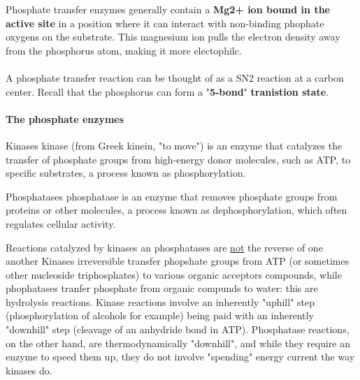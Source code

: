 \documentclass[../main.tex]{subfiles}
\begin{document}
Phosphate transfer enzymes generally contain a \textbf{Mg2+ ion bound in the active site} in a position where it can interact with non-binding phophate oxygens on the substrate. This magnesium ion pulls the electron density away from the phosphorus atom, making it more electophilc. \\
\\
A phosphate transfer reaction can be thought of as a SN2 reaction at a carbon center. Recall that the phosphorus can form a "\textbf{5-bond}" \textbf{tranistion state}.


\paragraph{The phosphate enzymes}
\begin{DefWithTitle}{Kinases}
	\gls{kinase} (from Greek kinein, "to move") is an enzyme that catalyzes the transfer of phosphate groups from high-energy donor molecules, such as ATP, to specific substrates, a process known as phosphorylation.
\end{DefWithTitle}
\begin{DefWithTitle}{Phosphatases}
	\gls{phosphatase} is an enzyme that removes phosphate groups from proteins or other molecules, a process known as dephosphorylation, which often regulates cellular activity.
\end{DefWithTitle}
\begin{RemarkWithTitel}{Reactions catalyzed by kinases an phosphatases are \underline{not} the reverse of one another}
	Kinases irreversible transfer phopshate groups from ATP (or sometimes other nucleoside triphosphates) to various organic acceptors compounds, while phophatases tranfer phosphate from organic compunds to water: this are hydrolysis reactions. Kinase reactions involve an inherently "uphill" step (phosphorylation of alcohols for example) being paid with an inherently "downhill" step (cleavage of an anhydride bond in ATP). Phosphatase reactions, on the other hand, are thermodynamically "downhill", and while they require an enzyme to speed them up, they do not involve "spending" energy current the way kinases do. 
\end{RemarkWithTitel} 
\end{document}

